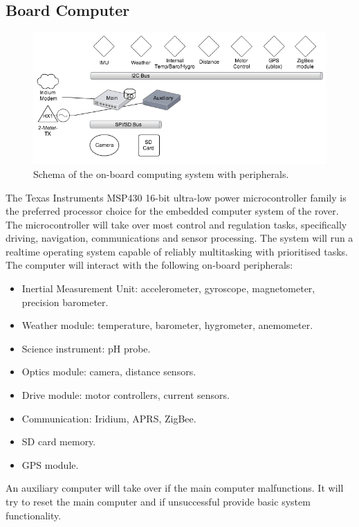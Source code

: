 \documentclass[a4paper,12pt]{article}
\begin{document}
\subsection{Board Computer}
\begin{figure}[h!]
	\centering
    \includegraphics[width=1\textwidth]{schema}
    \caption{Schema of the on-board computing system with peripherals.}
\end{figure} 
The Texas Instruments MSP430 16-bit ultra-low power microcontroller family is the preferred processor choice for the embedded computer system of the rover. The microcontroller will take over most control and regulation tasks, specifically driving, navigation, communications and sensor processing. The system will run a realtime operating system capable of reliably multitasking with prioritised tasks. The computer will interact with the following on-board peripherals:

\begin{itemize}
\item Inertial Measurement Unit: accelerometer, gyroscope, magnetometer, precision barometer.
\item Weather module: temperature, barometer, hygrometer, anemometer.
\item Science instrument: pH probe.
\item Optics module: camera, distance sensors.
\item Drive module: motor controllers, current sensors.
\item Communication: Iridium, APRS, ZigBee.
\item SD card memory.
\item GPS module.
\end{itemize}

An auxiliary computer will take over if the main computer malfunctions. It will try to reset the main computer and if unsuccessful provide basic system functionality.
\end{document}
